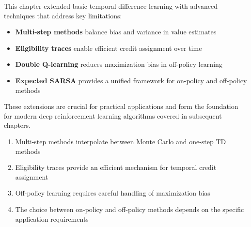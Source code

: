This chapter extended basic temporal difference learning with advanced techniques that address key limitations:

\begin{itemize}
\item \textbf{Multi-step methods} balance bias and variance in value estimates
\item \textbf{Eligibility traces} enable efficient credit assignment over time
\item \textbf{Double Q-learning} reduces maximization bias in off-policy learning
\item \textbf{Expected SARSA} provides a unified framework for on-policy and off-policy methods
\end{itemize}

These extensions are crucial for practical applications and form the foundation for modern deep reinforcement learning algorithms covered in subsequent chapters.

\begin{keyideabox}
\begin{enumerate}
\item Multi-step methods interpolate between Monte Carlo and one-step TD methods
\item Eligibility traces provide an efficient mechanism for temporal credit assignment
\item Off-policy learning requires careful handling of maximization bias
\item The choice between on-policy and off-policy methods depends on the specific application requirements
\end{enumerate}
\end{keyideabox}